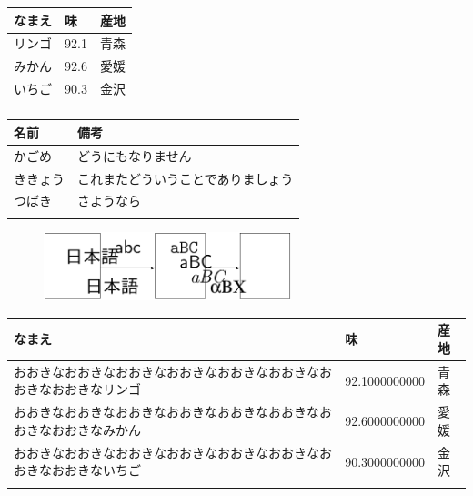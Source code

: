 \begin{multicols*}{2}
\begin{table} %
	\centering
	\begin{tabular}{lll}
		\Hline
			なまえ & 味 & 産地\\
		\hline
				リンゴ & 92.1 & 青森\\
				みかん & 92.6 & 愛媛\\
				いちご & 90.3 & 金沢\\
		\Hline
	\end{tabular}
\end{table}

\begin{table} %
	\centering		

	\begin{tabular}{p{}p{}}
		\Hline
		名前 & 備考\\
		\hline
		かごめ & どうにもなりません\\
		ききょう & これまたどういうことでありましょう\\
		つばき & さようなら \\
		\Hline
	\end{tabular}
\end{table}

\begin{figure} %
	\centering
	\includegraphics[height=2cm,width=\linewidth]{fig/concept.pdf}
\end{figure}

\begin{table} %
	\centering
{}
	\begin{tabular}{lll}
		\Hline
			なまえ & 味 & 産地\\
		\hline
			おおきなおおきなおおきなおおきなおおきなおおきなおおきなおおきなリンゴ & 92.1000000000 & 青森\\
			おおきなおおきなおおきなおおきなおおきなおおきなおおきなおおきなみかん & 92.6000000000 & 愛媛\\
			おおきなおおきなおおきなおおきなおおきなおおきなおおきなおおきないちご & 90.3000000000 & 金沢\\
		\Hline
	\end{tabular}
\end{table}



\end{multicols*}
